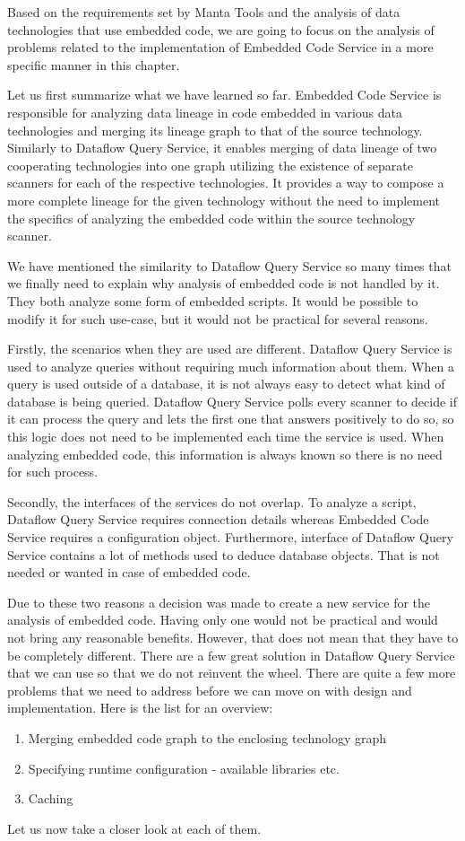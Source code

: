 Based on the requirements set by Manta Tools and the analysis of data technologies that use embedded code, we are going to focus on the analysis of problems related to the implementation of Embedded Code Service in a more specific manner in this chapter.
\par
Let us first summarize what we have learned so far. Embedded Code Service is responsible for analyzing data lineage in code embedded in various data technologies and merging its lineage graph to that of the source technology. Similarly to Dataflow Query Service, it enables merging of data lineage of two cooperating technologies into one graph utilizing the existence of separate scanners for each of the respective technologies. It provides a way to compose a more complete lineage for the given technology without the need to implement the specifics of analyzing the embedded code within the source technology scanner.
\par
We have mentioned the similarity to Dataflow Query Service so many times that we finally need to explain why analysis of embedded code is not handled by it. They both analyze some form of embedded scripts. It would be possible to modify it for such use-case, but it would not be practical for several reasons.
\par
Firstly, the scenarios when they are used are different. Dataflow Query Service is used to analyze queries without requiring much information about them. When a query is used outside of a database, it is not always easy to detect what kind of database is being queried. Dataflow Query Service polls every scanner to decide if it can process the query and lets the first one that answers positively to do so, so this logic does not need to be implemented each time the service is used. When analyzing embedded code, this information is always known so there is no need for such process.
\par
Secondly, the interfaces of the services do not overlap. To analyze a script, Dataflow Query Service requires connection details whereas Embedded Code Service requires a configuration object. Furthermore, interface of Dataflow Query Service contains a lot of methods used to deduce database objects. That is not needed or wanted in case of embedded code.
\par
Due to these two reasons a decision was made to create a new service for the analysis of embedded code. Having only one would not be practical and would not bring any reasonable benefits. However, that does not mean that they have to be completely different. There are a few great solution in Dataflow Query Service that we can use so that we do not reinvent the wheel. There are quite a few more problems that we need to address before we can move on with design and implementation. Here is the list for an overview:
\begin{enumerate}
    \item Merging embedded code graph to the enclosing technology graph
    \item Specifying runtime configuration - available libraries etc.
    \item Caching
\end{enumerate}
Let us now take a closer look at each of them.

